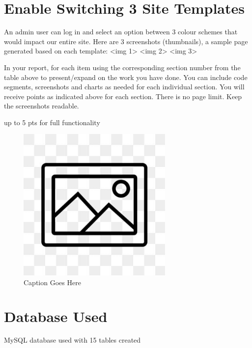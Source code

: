 \documentclass[12pt, letterpaper]{article}
\begin{document}
 \newpage

\section{Enable Switching 3 Site Templates}
An admin user can log in and select an option between 3 colour schemes that would impact our entire site. Here are 3 screenshots (thumbnails), a sample page generated based on each template: <img 1> <img 2> <img 3>

In your report, for each item using the corresponding section number from the table above to present/expand on the work you have done. You can include code segments, screenshots and charts as needed for each individual section. You will receive points as indicated above for each section. There is no page limit. Keep the screenshots readable.

up to 5 pts for full functionality

\begin{figure}[htbp]
	\centering
	\includegraphics[width=3in]{images/placeholder.jpg}
	\caption{Caption Goes Here}
 \end{figure}

 \newpage

\section{Database Used}
MySQL database used with 15 tables created
\end{document}
